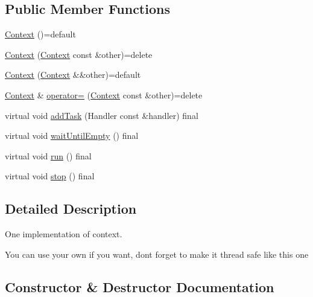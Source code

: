 \subsection*{Public Member Functions}
\begin{DoxyCompactItemize}
\item 
\hyperlink{classzany_1_1_context_aed673136ee170788d0cd5717857c81c4}{Context} ()=default
\item 
\hyperlink{classzany_1_1_context_aaf02dd357e71f0608f6c034c5222930c}{Context} (\hyperlink{classzany_1_1_context}{Context} const \&other)=delete
\item 
\hyperlink{classzany_1_1_context_a0f3ea7fa76d75e239ac8ec95a517822e}{Context} (\hyperlink{classzany_1_1_context}{Context} \&\&other)=default
\item 
\hyperlink{classzany_1_1_context}{Context} \& \hyperlink{classzany_1_1_context_a35af38bc82dcac073aa0dbc0acca032d}{operator=} (\hyperlink{classzany_1_1_context}{Context} const \&other)=delete
\item 
virtual void \hyperlink{classzany_1_1_context_a448dcb8a627491eb4c8de0f46cd13ab1}{add\+Task} (Handler const \&handler) final
\item 
virtual void \hyperlink{classzany_1_1_context_aa611ac3befc23b58e8cef92932f21b67}{wait\+Until\+Empty} () final
\item 
virtual void \hyperlink{classzany_1_1_context_af7642e436736dbe466c476b56435d90f}{run} () final
\item 
virtual void \hyperlink{classzany_1_1_context_ae99b0f88172d429cc43b83effced053e}{stop} () final
\end{DoxyCompactItemize}


\subsection{Detailed Description}
One implementation of context. 

You can use your own if you want, don\textquotesingle{}t forget to make it thread safe like this one 

\subsection{Constructor \& Destructor Documentation}
\mbox{\label{classzany_1_1_context_aed673136ee170788d0cd5717857c81c4}} 
